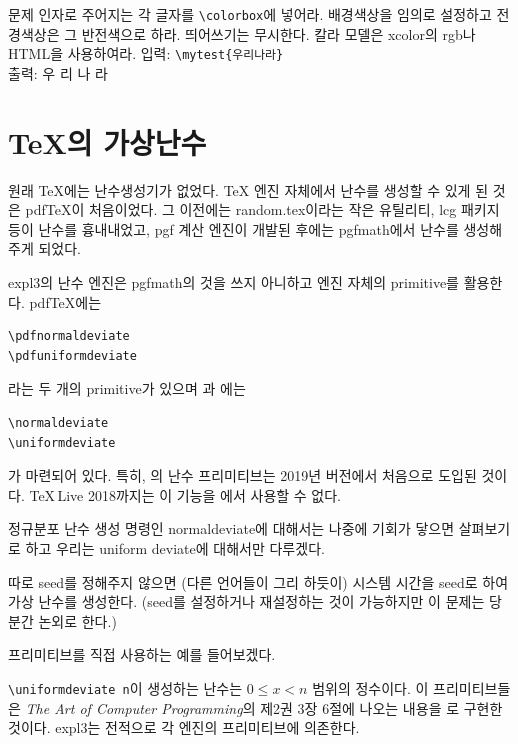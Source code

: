 \documentclass[a4paper,amsmath]{oblivoir}
\begin{document}
\newpage

\begin{questiona}{문제}
인자로 주어지는 각 글자를 \verb|\colorbox|에 넣어라. 배경색상을 임의로 설정하고 전경색상은 그 반전색으로 하라. 띄어쓰기는 무시한다. 칼라 모델은 \textsf{xcolor}의 rgb나 HTML을 사용하여라. 
\tcblower
입력: \verb|\mytest{우리나라}|\\
출력: %
%
\colorbox{ba}{\color{fo}우}%
%
\colorbox{ba}{\color{fo}리}%
%
\colorbox{ba}{\color{fo}나}%
%
\colorbox{ba}{\color{fo}라}%
\end{questiona}

\section{\protect\TeX 의 가상난수}

원래 \TeX 에는 난수생성기가 없었다. \TeX{} 엔진 자체에서 난수를 생성할 수 있게 된 것은 
pdf\TeX 이 처음이었다.
그 이전에는 \textsf{random.tex}이라는 작은 유틸리티, \textsf{lcg} 패키지 등이 난수를 흉내내었고,
\textsf{pgf} 계산 엔진이 개발된 후에는 \textsf{pgfmath}에서 난수를 생성해주게 되었다.

expl3의 난수 엔진은 \textsf{pgfmath}의 것을 쓰지 아니하고 엔진 자체의 primitive를 활용한다.
pdf\TeX 에는 
\begin{verbatim}
\pdfnormaldeviate
\pdfuniformdeviate
\end{verbatim}
라는 두 개의 primitive가 있으며 과 에는 
\begin{verbatim}
\normaldeviate
\uniformdeviate
\end{verbatim}
가 마련되어 있다. 특히, 의 난수 프리미티브는 2019년 버전에서 처음으로 도입된 것이다.
\TeX\,Live 2018까지는 이 기능을 에서 사용할 수 없다.

정규분포 난수 생성 명령인 normaldeviate에 대해서는 나중에 기회가 닿으면 살펴보기로 하고 우리는 uniform deviate에 대해서만 다루겠다.

따로 seed를 정해주지 않으면 (다른 언어들이 그리 하듯이) 시스템 시간을 seed로 하여 가상 난수를 생성한다.
(seed를 설정하거나 재설정하는 것이 가능하지만 이 문제는 당분간 논외로 한다.)

프리미티브를 직접 사용하는 예를 들어보겠다.

\begin{exampleside}
\ifPDFTeX
    \let\uniformdeviate\pdfuniformdeviate
\fi
\uniformdeviate 100 
\end{exampleside}
\verb|\uniformdeviate n|이 생성하는 난수는 $0 \le x < n$ 범위의 정수이다.
이 프리미티브들은 \emph{The Art of Computer Programming}의 제2권 3장 6절에 나오는 내용을 로 구현한 것이다.
expl3는 전적으로 각 엔진의 프리미티브에 의존한다.
\end{document}
